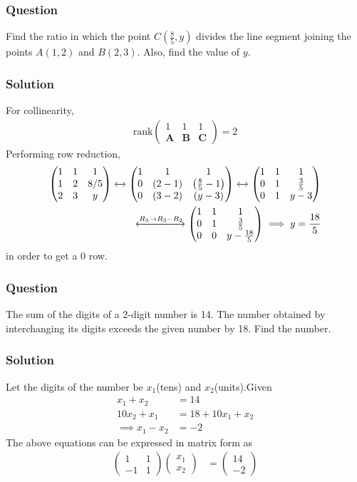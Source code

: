 \documentclass{beamer}
\providecommand{\brak}[1]{\ensuremath{\left(#1\right)}}
\theoremstyle{remark}
\newcommand{\myvec}[1]{\ensuremath{\begin{pmatrix}#1\end{pmatrix}}}
\let\vec\mathbf
\begin{document}
%
\begin{frame}
\frametitle{Question }
Find the ratio in which the point $C\brak{\frac{8}{5},y}$ divides the line segment joining the points $A\brak{1,2}$ and $B\brak{2,3}$. Also, find the value of $y$. 
\end{frame}
%
\begin{frame}
\frametitle{Solution}
    For collinearity,
    \begin{align}
          \text{rank}\myvec{
        1 & 1 & 1\\
	    \vec{A} & \vec{B} & \vec{C}
    } =2 \label{eq:10}
\end{align}
	Performing row reduction,
\begin{align}
    \myvec{
        1 & 1 & 1\\
        1 & 2 & 8/5\\
        2 & 3 & y
    } \xleftrightarrow{}
    \myvec{
        1 & 1 & 1\\
        0 & \brak{2-1} & \brak{\frac{8}{5}-1}\\
        0 & \brak{3-2} & \brak{y-3}
    }\xleftrightarrow{}
    \myvec{
        1 & 1 & 1\\
        0 & 1 & \frac{3}{5}\\
        0 & 1 & y-3
    }
    \\
    \xleftrightarrow{R_3\rightarrow R_3-R_2}
    \myvec{
        1 & 1 & 1\\
        0 & 1 & \frac{3}{5}\\
        0 & 0 & y-\frac{18}{5}
    }
    \implies y = \frac{18}{5}
\end{align}
in order to get a 0 row.
\end{frame}
%
\begin{frame}
\frametitle{Question }
The sum of the digits of a $2$-digit number is 14. The number obtained by interchanging     its digits exceeds the given number by 18. Find the number.
\end{frame}
%
\begin{frame}
\frametitle{Solution}
Let the digits of the number be $x_1$(tens) and $x_2$(units).Given
\begin{align}
    x_1+x_2 &= 14 \label{1}\\
    10x_2+x_1 &= 18 + 10x_1+x_2\\
    \implies x_1-x_2 &= -2\label{2}
\end{align}
The above equations can be expressed in matrix form
as
\begin{align}
    \myvec{
        1 & 1\\
        -1 & 1
    }
    \myvec{
        x_1\\
        x_2
    } &= \myvec{
        14\\
        -2
    }   \\
    \end{align}
\end{frame}
\end{document}
